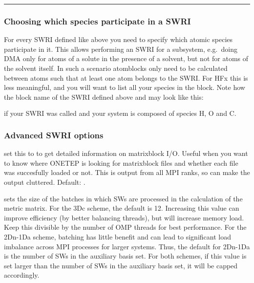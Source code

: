 \documentclass[letterpaper,10pt,english]{sphinxmanual}
\begin{document}
\bigskip\hrule\bigskip



\subsubsection{Choosing which species participate in a SWRI}
\label{\detokenize{hfx:choosing-which-species-participate-in-a-swri}}
For every SWRI defined like above you need to specify which atomic
species participate in it. This allows performing an SWRI for a
subsystem, e.g. doing DMA only for atoms of a solute in the presence of
a solvent, but not for atoms of the solvent itself. In such a scenario
atomblocks only need to be calculated between atoms such that at least
one atom belongs to the SWRI. For HFx this is less meaningful, and you
will want to list all your species in the block. Note how the block name
 of the SWRI defined above and may look like this:

%
\begin{sphinxVerbatim}[commandchars=\\\{\}]
 
 
\end{sphinxVerbatim}

if your SWRI was called  and your system is composed of
species H, O and C.


\subsubsection{Advanced SWRI options}
\label{\detokenize{hfx:advanced-swri-options}}
 \textendash{} set this to  to get detailed
information on matrixblock I/O. Useful when you want to know where
ONETEP is looking for matrixblock files and whether each file was
succesfully loaded or not. This is output from all MPI ranks, so can
make the output cluttered. Default: .

 \textendash{} sets the size of the batches in
which SWs are processed in the calculation of the metric matrix. For the
3Dc scheme, the default is 12. Increasing this value can improve
efficiency (by better balancing threads), but will increase memory load.
Keep this divisible by the number of OMP threads for best performance.
For the 2Dn-1Da scheme, batching has little benefit and can lead to
significant load imbalance across MPI processes for larger systems.
Thus, the default for 2Dn-1Da is the number of SWs in the auxiliary
basis set. For both schemes, if this value is set larger than the number
of SWs in the auxiliary basis set, it will be capped accordingly.
\end{document}
